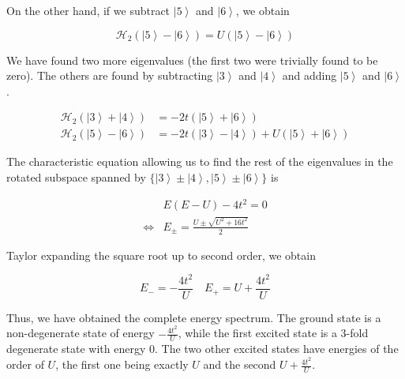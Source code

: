 On the other hand, if we subtract $\left| 5 \right\rangle$ and $\left| 6 \right\rangle$, we obtain

\begin{equation}
\mathcal{H}_{2}(\left| 5 \right\rangle -\left| 6 \right\rangle) = U( \left| 5 \right\rangle - \left| 6 \right\rangle)
\end{equation}

We have found two more eigenvalues (the first two were trivially found to be zero). The others are found by subtracting $\left| 3 \right\rangle$ and $\left| 4 \right\rangle $ and adding $\left| 5 \right\rangle$ and $\left| 6 \right\rangle$.

\begin{equation}
\begin{split}
\mathcal{H}_{2} ( \left| 3 \right\rangle + \left| 4 \right\rangle ) &= -2 t  (\left| 5 \right\rangle + \left| 6 \right\rangle) \\
\mathcal{H}_{2}(\left| 5 \right\rangle -\left| 6 \right\rangle) &= - 2 t (\left| 3 \right\rangle - \left| 4 \right\rangle ) + U (\left| 5 \right\rangle + \left| 6 \right\rangle) 
\end{split}
\end{equation}

The characteristic equation allowing us to find the rest of the eigenvalues in the rotated subspace spanned by $\{\left| 3 \right\rangle \pm \left| 4 \right\rangle, \left| 5 \right\rangle \pm \left| 6 \right\rangle  \}$ is

\begin{equation}
\begin{split}
&E ( E - U ) - 4 t^2 = 0 \\
\iff&E_{\pm} = \frac{U \pm \sqrt{U^2 + 16 t^2}}{2}
\end{split}
\end{equation}

Taylor expanding the square root up to second order, we obtain

\begin{equation}
E_- = -\frac{4t^2}{U} \quad E_+ = U + \frac{4t^2}{U}
\end{equation}

Thus, we have obtained the complete energy spectrum. The ground state is a non-degenerate state of energy $-\frac{4t^2}{U}$, while the first excited state is a 3-fold degenerate state with energy $0$. The two other excited states have energies of the order of $U$, the first one being exactly $U$ and the second $U + \frac{4t^2}{U}$.

